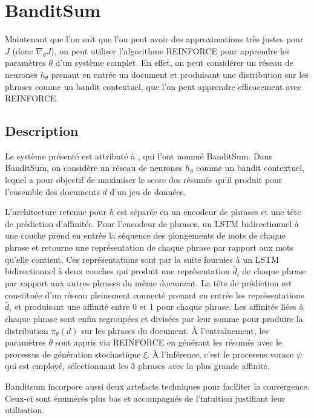 \section{BanditSum}

Maintenant que l'on sait que l'on peut avoir des approximations très justes pour
$J$ (donc $\nabla_\theta J$), on peut utiliser l'algorithme REINFORCE pour apprendre
les paramètres $\theta$ d'un système complet.
En effet, on peut considérer un réseau de neurones $h_\theta$ prenant en entrée un document et produisant
une distribution sur les phrases comme un bandit contextuel, que l'on peut apprendre
efficacement avec REINFORCE.

\subsection{Description}

Le système présenté est attributé à \citep{dong2018banditsum}, qui l'ont nommé 
BanditSum.
Dans BanditSum, on considère un réseau de neurones $h_\theta$ comme un bandit contextuel,
lequel a pour objectif de maximiser le score des résumés qu'il produit pour l'ensemble 
des documents $d$ d'un jeu de données.

L'architecture retenue pour $h$ est séparée en un encodeur de phrases et une tête 
de prédiction d'affinités.
Pour l'encodeur de phrases, un LSTM bidirectionnel à une couche prend en entrée
la séquence des plongements de mots de chaque phrase et retourne une représentation de 
chaque phrase par rapport aux mots qu'elle contient.
Ces représentations sont par la suite fournies à un LSTM bidirectionnel à deux couches qui 
produit une représentation $\tilde{d_i}$ de chaque phrase par rapport aux autres phrases du même 
document.
La tête de prédiction est constituée d'un réseau pleinement connecté prenant en entrée 
les représentations $\tilde{d_i}$ et produisant une affinité entre 0 et 1 pour chaque phrase.
Les affinités liées à chaque phrase sont enfin regroupées et divisées par leur somme 
pour produire la distribution $\pi_\theta(d)$ sur les phrases du document.
À l'entraînement, les paramètres $\theta$ sont appris via REINFORCE en générant 
les résumés avec le processus de génération stochastique $\xi$.
À l'inférence, c'est le processus vorace $\psi$ qui est employé, sélectionnant les 
3 phrases avec la plus grande affinité.


Banditsum incorpore aussi deux artefacts techniques pour faciliter la convergence.
Ceux-ci sont énumérés plus bas et accompagnés de l'intuition justifiant leur 
utilisation.

